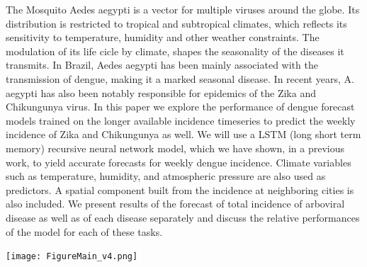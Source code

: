 \documentclass[a0,portrait]{a0poster}
\begin{document}

\begin{multicols}{3} %


\noindent
The Mosquito Aedes aegypti is a vector for multiple viruses around the globe. Its distribution is restricted to tropical and subtropical climates, which reflects its sensitivity to temperature, humidity and other weather constraints. The modulation of its life cicle by climate, shapes the seasonality of the diseases it transmits.
 In Brazil, Aedes aegypti has been mainly associated with the transmission of dengue, making it a marked seasonal disease. In recent years, A. aegypti has also been notably responsible for epidemics of the Zika and Chikungunya virus. In this paper we explore the performance of dengue forecast models trained on the longer available incidence timeseries to predict the weekly incidence of Zika and Chikungunya as well.  We will use a LSTM (long short term memory) recursive neural network model, which we have shown, in a previous work, to yield accurate forecasts for weekly dengue incidence. Climate variables such as temperature, humidity, and atmospheric pressure are also used as predictors. A spatial component built from the incidence at neighboring cities is also included. We present results of the forecast of total incidence of arboviral disease as well as of each disease separately and discuss the relative performances of the model for each of these tasks.



\begin{center}\vspace{1cm}
\texttt{[image: FigureMain\_v4.png]}
\end{center}%


\end{multicols}
\end{document}

